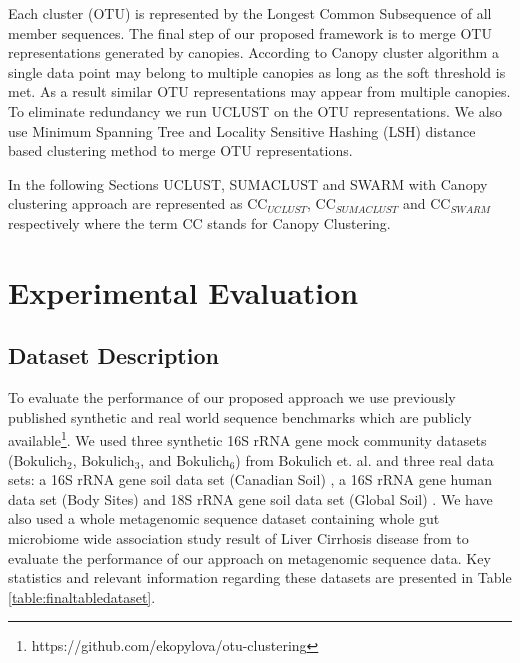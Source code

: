\documentclass[10pt, conference, compsocconf]{IEEEtran}
\begin{document}
Each cluster (OTU) is represented by the Longest Common Subsequence of all member sequences. The final step of our proposed framework is to merge OTU representations generated by canopies. According to Canopy cluster algorithm a single data point may belong to multiple canopies as long as the soft threshold is met. As a result similar OTU representations may appear from multiple canopies. To eliminate redundancy we run UCLUST on the OTU representations. We also use Minimum Spanning Tree and Locality Sensitive Hashing (LSH) distance based clustering method to merge OTU representations.  
 
In the following Sections UCLUST, SUMACLUST and SWARM with Canopy clustering approach are represented as CC$_{UCLUST}$, CC$_{SUMACLUST}$ and CC$_{SWARM}$ respectively where the term CC stands for Canopy Clustering. 

\section{Experimental Evaluation}
\label{sec:Experimental}

\subsection{\textbf{Dataset Description}}


To evaluate the performance of our proposed approach we use previously published synthetic and real world sequence benchmarks \cite{MARopenDeNovo} which are publicly available\footnote{https://github.com/ekopylova/otu-clustering}. We used three synthetic 16S rRNA gene mock community datasets (Bokulich$_2$, Bokulich$_3$, and Bokulich$_6$) from Bokulich et. al. \cite{MARmockDatasetRef} and three real data sets: a 16S rRNA gene soil data set (Canadian Soil) \cite{MARcanadianSoil}, a 16S rRNA gene human data set (Body Sites) \cite{MARbodySites} and 18S rRNA gene soil data set (Global Soil) \cite{MARglobalSoil}. We have also used a whole metagenomic sequence dataset containing whole gut microbiome wide association study result of Liver Cirrhosis disease from \cite{qin2014alterations} to evaluate the performance of our approach on metagenomic sequence data. Key statistics and relevant information regarding these datasets are presented in Table \ref{table:finaltabledataset}. 
\end{document}
